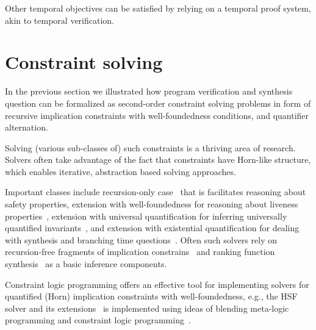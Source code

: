 \documentclass{new_tlp}
\begin{document}
Other temporal objectives can be satisfied by relying on a temporal
proof system, akin to temporal verification.

\section{Constraint solving}

In the previous section we illustrated how program verification and
synthesis question can be formalized as second-order constraint
solving problems in form of recursive implication constraints with
well-foundedness conditions, and quantifier alternation. 

Solving (various sub-classes of) such constraints is a thriving area
of research.
Solvers often take advantage of the fact that constraints have
Horn-like structure, which enables iterative, abstraction based
solving approaches.

Important classes include recursion-only
case~\cite{muz,GrebenshchikovPLDI12,Duality,RummerDisj2013} that is
facilitates reasoning about safety properties, extension with
well-foundedness for reasoning about liveness
properties~\cite{GrebenshchikovPLDI12}, extension with universal
quantification for inferring universally quantified
invariants~\cite{UnivSAS2013}, and extension with existential
quantification for dealing with synthesis and branching time
questions~\cite{ehsf}.
Often such solvers rely on recursion-free fragments of implication
constrains~\cite{McMillanSplitProver,HornLIUIF11,InterSystems13,TreeVampire13}
and ranking function synthesis~\cite{RybalPodelskiVMCAI04} as a basic
inference components.

Constraint logic programming offers an effective tool for implementing
solvers for quantified (Horn) implication constraints with
well-foundedness, e.g., the HSF solver and its
extensions~\cite{HSF,ehsf,UnivSAS2013} is implemented using ideas of
blending meta-logic programming and constraint logic
programming~\cite{RybalPodelskiPADL07}.


 

\end{document}
